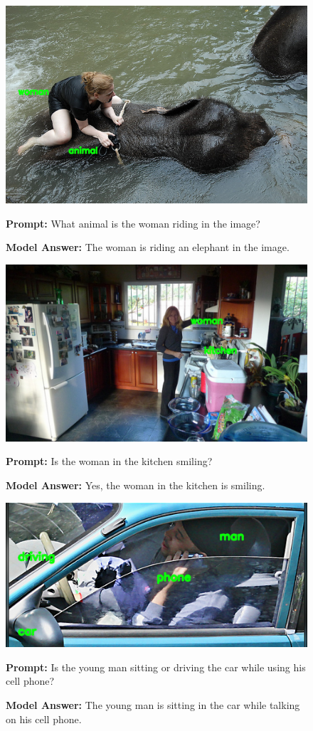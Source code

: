 \documentclass[11pt]{article}
\begin{document}
\begin{figure}[H]
    \centering    
    \includegraphics[width=0.6\linewidth]{reordering_9.png}\par
    \vspace{1em}
    \raggedright
    \textbf{Prompt:} What animal is the woman riding in the image?
    
    \textbf{Model Answer:} The woman is riding an elephant in the image.
\end{figure}

\begin{figure}[H]
    \centering
    \includegraphics[width=0.7\linewidth]{reordering_10.png}\par
    \vspace{1em}
    \raggedright
    \textbf{Prompt:} Is the woman in the kitchen smiling?
    
    \textbf{Model Answer:} Yes, the woman in the kitchen is smiling.
\end{figure}





\begin{figure}[H]
    \centering
    \includegraphics[width=0.6\linewidth]{reordering_61.png}\par
    \vspace{1em}
    \raggedright
    \textbf{Prompt:} Is the young man sitting or driving the car while using his cell phone?
    
    \textbf{Model Answer:} The young man is sitting in the car while talking on his cell phone.
\end{figure}
\end{document}
